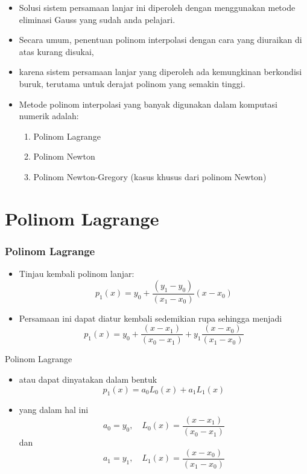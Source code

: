 \documentclass[pdflatex,compress,mathserif]{beamer}
\begin{document}
\begin{frame}
	\begin{itemize}
		\item Solusi sistem persamaan lanjar ini diperoleh dengan menggunakan metode eliminasi Gauss yang sudah anda pelajari.
		\item Secara umum, penentuan polinom interpolasi dengan cara yang diuraikan di atas kurang disukai,
		\item karena sistem persamaan lanjar yang diperoleh ada kemungkinan berkondisi buruk, terutama untuk derajat polinom yang semakin tinggi.
		\item Metode polinom interpolasi yang banyak digunakan dalam komputasi numerik adalah:
		\begin{enumerate}
			\item Polinom Lagrange
			\item Polinom Newton
			\item Polinom Newton-Gregory (kasus khusus dari polinom Newton)
		\end{enumerate}
	\end{itemize}
\end{frame}

\section{Polinom Lagrange}

\begin{frame}
	\frametitle{Polinom Lagrange}
	\begin{itemize}
		\item Tinjau kembali polinom lanjar:
		\[ p_1(x) = y_0 + \frac{(y_1 - y_0)}{(x_1 - x_0)}(x-x_0) \]
		\item Persamaan ini dapat diatur kembali sedemikian rupa sehingga menjadi
		\[ p_1(x) = y_0 + \frac{(x - x_1)}{(x_0 - x_1)} + y_1\frac{(x-x_0)}{(x_1-x_0)} \]
	\end{itemize}
\end{frame}

\begin{frame}{Polinom Lagrange}
	\begin{itemize}
		\item atau dapat dinyatakan dalam bentuk
		\[ p_1(x) = a_0 L_0 (x) + a_1 L_1 (x) \]
		\item yang dalam hal ini
		\[ a_0 = y_0,\quad L_0(x) = \frac{(x-x_1)}{(x_0-x_1)} \]
		dan
		\[ a_1 = y_1,\quad L_1(x) = \frac{(x-x_0)}{(x_1-x_0)} \]
	\end{itemize}
\end{frame}
\end{document}
